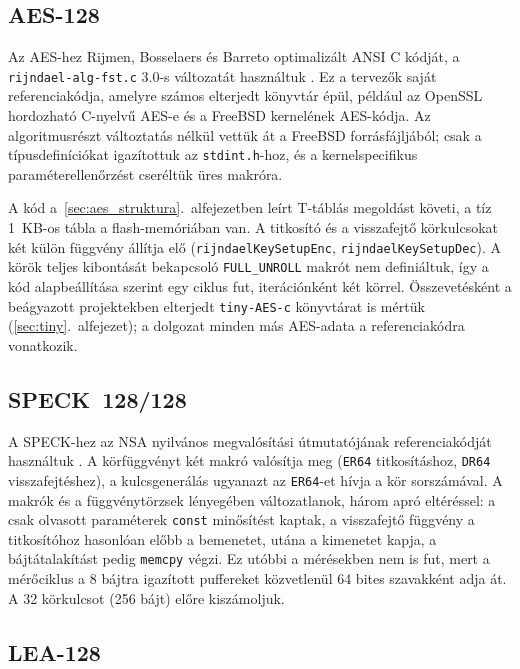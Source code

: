 \documentclass[a4paper,12pt]{report}
\theoremstyle{definition}
\theoremstyle{remark}
\begin{document}
\subsection{AES-128}

Az AES-hez Rijmen, Bosselaers és Barreto optimalizált ANSI C kódját, a \texttt{rijndael-alg-fst.c} 3.0-s változatát használtuk \cite{RijndaelFst}. Ez a tervezők saját referenciakódja, amelyre számos elterjedt könyvtár épül, például az OpenSSL hordozható C-nyelvű AES-e és a FreeBSD kernelének AES-kódja. Az algoritmusrészt változtatás nélkül vettük át a FreeBSD forrásfájljából; csak a típusdefiníciókat igazítottuk az \texttt{stdint.h}-hoz, és a kernelspecifikus paraméterellenőrzést cseréltük üres makróra.

A kód a~\ref{sec:aes_struktura}.~alfejezetben leírt T-táblás megoldást követi, a tíz 1~KB-os tábla a flash-memóriában van. A titkosító és a visszafejtő körkulcsokat két külön függvény állítja elő (\texttt{rijndaelKeySetupEnc}, \texttt{rijndaelKeySetupDec}). A körök teljes kibontását bekapcsoló \texttt{FULL\_UNROLL} makrót nem definiáltuk, így a kód alapbeállítása szerint egy ciklus fut, iterációnként két körrel. Összevetésként a beágyazott projektekben elterjedt \texttt{tiny-AES-c} könyvtárat \cite{TinyAES} is mértük (\ref{sec:tiny}.~alfejezet); a dolgozat minden más AES-adata a referenciakódra vonatkozik.

\subsection{SPECK~128/128}

A SPECK-hez az NSA nyilvános megvalósítási útmutatójának referenciakódját használtuk \cite{Beaulieu2019}. A körfüggvényt két makró valósítja meg (\texttt{ER64} titkosításhoz, \texttt{DR64} visszafejtéshez), a kulcsgenerálás ugyanazt az \texttt{ER64}-et hívja a kör sorszámával. A makrók és a függvénytörzsek lényegében változatlanok, három apró eltéréssel: a csak olvasott paraméterek \texttt{const} minősítést kaptak, a visszafejtő függvény a titkosítóhoz hasonlóan előbb a bemenetet, utána a kimenetet kapja, a bájtátalakítást pedig \texttt{memcpy} végzi. Ez utóbbi a mérésekben nem is fut, mert a mérőciklus a 8 bájtra igazított puffereket közvetlenül 64 bites szavakként adja át. A 32 körkulcsot (256 bájt) előre kiszámoljuk.

\subsection{LEA-128}
\end{document}
